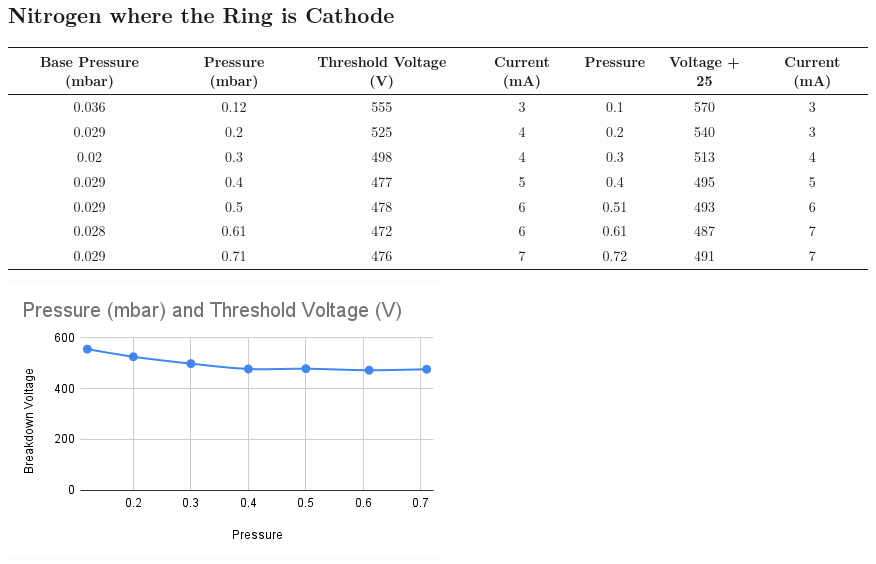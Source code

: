 \documentclass[]{report}[12 pt]
\begin{document}
\subsection{Nitrogen where the Ring is Cathode}
\begin{center}
	\begin{tabular}{|c|c|c|c|c|c|c|}
		\hline
		Base Pressure (mbar) & Pressure (mbar) & Threshold Voltage (V) & Current (mA) & Pressure & Voltage + 25 & Current (mA) \\ \hline
		0.036                & 0.12            & 555                   & 3            & 0.1      & 570          & 3            \\ \hline
		0.029                & 0.2             & 525                   & 4            & 0.2      & 540          & 3            \\ \hline
		0.02                 & 0.3             & 498                   & 4            & 0.3      & 513          & 4            \\ \hline
		0.029                & 0.4             & 477                   & 5            & 0.4      & 495          & 5            \\ \hline
		0.029                & 0.5             & 478                   & 6            & 0.51     & 493          & 6            \\ \hline
		0.028                & 0.61            & 472                   & 6            & 0.61     & 487          & 7            \\ \hline
		0.029                & 0.71            & 476                   & 7            & 0.72     & 491          & 7            \\ \hline
	\end{tabular}
	\includegraphics[width=10 cm]{plasma3.png}
\end{center}
\end{document}
